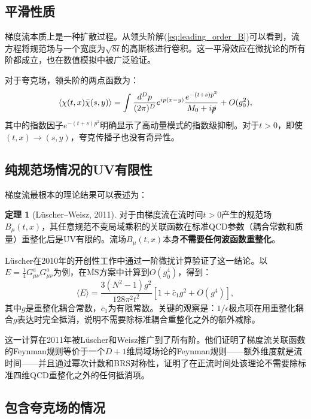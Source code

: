 \documentclass[12pt,a4paper]{ctexart}
\theoremstyle{definition}
\newtheorem{theorem}{定理}[section]
\begin{document}
\subsection{平滑性质}

梯度流本质上是一种扩散过程。从领头阶解(\ref{eq:leading_order_B})可以看到，流方程将规范场与一个宽度为$\sqrt{8t}$的高斯核进行卷积。这一平滑效应在微扰论的所有阶都成立，也在数值模拟中被广泛验证\cite{Luscher2014}。

对于夸克场，领头阶的两点函数为\cite{Luscher2013}：
\begin{equation}
\langle \chi(t,x) \bar{\chi}(s,y) \rangle = \int \frac{d^D p}{(2\pi)^D} e^{ip(x-y)} \frac{e^{-(t+s)p^2}}{M_0 + i\slashed{p}} + O(g_0^2),
\label{eq:quark_prop}
\end{equation}
其中的指数因子$e^{-(t+s)p^2}$明确显示了高动量模式的指数级抑制。对于$t>0$，即使$(t,x) \to (s,y)$，夸克传播子也没有奇异性。

\subsection{纯规范场情况的UV有限性}

梯度流最根本的理论结果可以表述为\cite{Luscher2010,LuscherWeisz2011}：

\begin{theorem}[L\"uscher--Weisz, 2011]
对于由梯度流在流时间$t>0$产生的规范场$B_\mu(t,x)$，其任意规范不变局域乘积的关联函数在标准QCD参数（耦合常数和质量）重整化后是UV有限的。流场$B_\mu(t,x)$本身\textbf{不需要任何波函数重整化}。
\end{theorem}

L\"uscher在2010年的开创性工作中通过一阶微扰计算验证了这一结论\cite{Luscher2010}。以$E = \frac{1}{4}G_{\mu\nu}^a G_{\mu\nu}^a$为例，在$\overline{\text{MS}}$方案中计算到$O(g_0^4)$，得到：
\begin{equation}
\langle E \rangle = \frac{3(N^2-1)g^2}{128\pi^2 t^2} \left[ 1 + \bar{c}_1 g^2 + O(g^4) \right],
\label{eq:Ev}
\end{equation}
其中$g$是重整化耦合常数，$\bar{c}_1$为有限常数。关键的观察是：$1/\epsilon$极点项在用重整化耦合$g$表达时完全抵消，说明不需要除标准耦合重整化之外的额外减除。

这一计算在2011年被L\"uscher和Weisz推广到了所有阶\cite{LuscherWeisz2011}。他们证明了梯度流关联函数的Feynman规则等价于一个$D+1$维局域场论的Feynman规则——额外维度就是流时间——并且通过幂次计数和BRS对称性，证明了在正流时间处该理论不需要除标准四维QCD重整化之外的任何抵消项。

\subsection{包含夸克场的情况}
\end{document}
